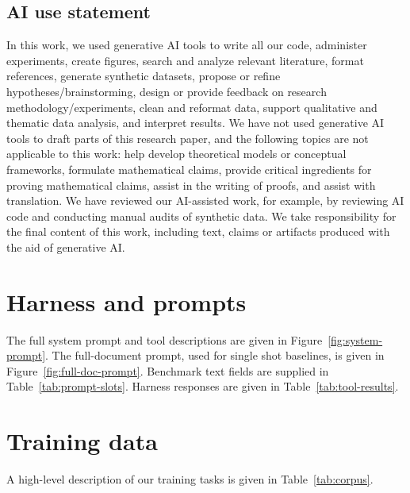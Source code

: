 \subsection*{AI use statement}

In this work, we used generative AI tools to write all our code, administer experiments, create figures, search and analyze relevant literature, format references, generate synthetic datasets, propose or refine hypotheses/brainstorming, design or provide feedback on research methodology/experiments, clean and reformat data, support qualitative and thematic data analysis, and interpret results. We have not used generative AI tools to draft parts of this research paper, and the following topics are not applicable to this work: help develop theoretical models or conceptual frameworks, formulate mathematical claims, provide critical ingredients for proving mathematical claims, assist in the writing of proofs, and assist with translation. We have reviewed our AI-assisted work, for example, by reviewing AI code and conducting manual audits of synthetic data. We take responsibility for the final content of this work,
including text, claims or artifacts produced with the aid of generative AI.




\raggedbottom



\pagebreak

\clearpage
\appendix
\section{Harness and prompts}
\label{app:harness}

The full system prompt and tool descriptions are given in Figure~\ref{fig:system-prompt}. The full-document prompt, used for single shot baselines, is given in Figure~\ref{fig:full-doc-prompt}. Benchmark text fields are supplied in Table~\ref{tab:prompt-slots}. Harness responses are given in Table~\ref{tab:tool-results}.



\clearpage
\section{Training data}
\label{app:data}

A high-level description of our training tasks is given in Table~\ref{tab:corpus}. 



